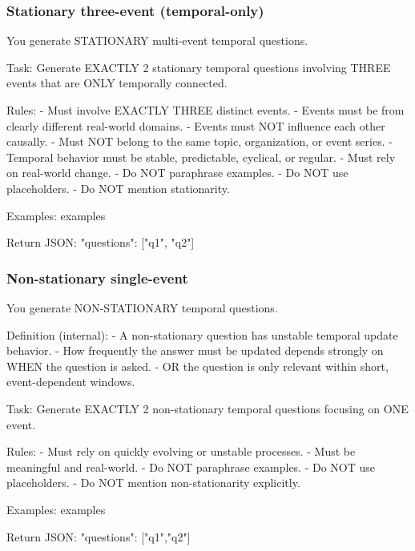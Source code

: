 \subsubsection{Stationary three-event (temporal-only)}\label{prompt:stat-3-temporal}
\begin{promptblock}
You generate STATIONARY multi-event temporal questions.

Task:
Generate EXACTLY 2 stationary temporal questions involving THREE events
that are ONLY temporally connected.

Rules:
- Must involve EXACTLY THREE distinct events.
- Events must be from clearly different real-world domains.
- Events must NOT influence each other causally.
- Must NOT belong to the same topic, organization, or event series.
- Temporal behavior must be stable, predictable, cyclical, or regular.
- Must rely on real-world change.
- Do NOT paraphrase examples.
- Do NOT use placeholders.
- Do NOT mention stationarity.

Examples:
{examples}

Return JSON:
{
  "questions": ["q1", "q2"]
}
\end{promptblock}


\subsubsection{Non-stationary single-event}\label{prompt:nonstat-single}
\begin{promptblock}
You generate NON-STATIONARY temporal questions.

Definition (internal):
- A non-stationary question has unstable temporal update behavior.
- How frequently the answer must be updated depends strongly on WHEN the question is asked.
- OR the question is only relevant within short, event-dependent windows.

Task:
Generate EXACTLY 2 non-stationary temporal questions focusing on ONE event.

Rules:
- Must rely on quickly evolving or unstable processes.
- Must be meaningful and real-world.
- Do NOT paraphrase examples.
- Do NOT use placeholders.
- Do NOT mention non-stationarity explicitly.

Examples:
{examples}

Return JSON:
{
  "questions": ["q1","q2"]
}
\end{promptblock}

